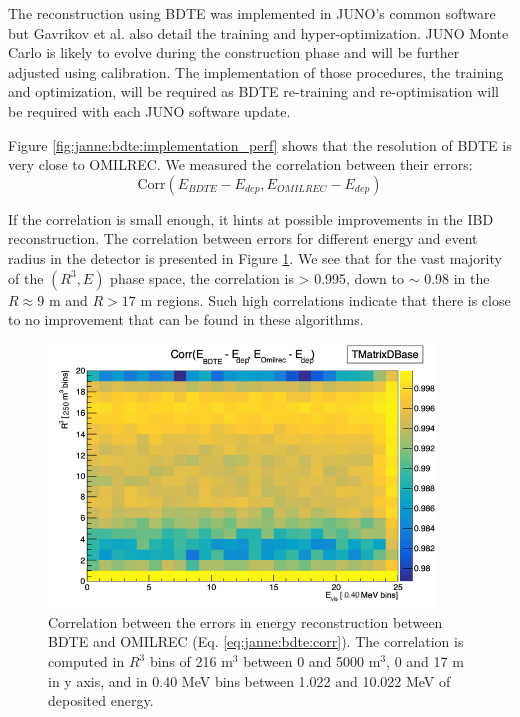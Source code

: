 \documentclass[../main.tex]{subfiles}
\begin{document}
The reconstruction using BDTE was implemented in JUNO's common software but Gavrikov et al. also detail the training and hyper-optimization. JUNO Monte Carlo is likely to evolve during the construction phase and will be further adjusted using calibration. The implementation of those procedures, the training and optimization, will be required as BDTE re-training and re-optimisation will be required with each JUNO software update.

Figure \ref{fig:janne:bdte:implementation_perf} shows that the resolution of BDTE is very close to OMILREC. We measured the correlation between their errors:
\begin{equation}
  \label{eq:janne:bdte:corr}
\mathrm{Corr}(E_{BDTE} - E_{dep}, E_{OMILREC} - E_{dep})
\end{equation}

If the correlation is small enough, it hints at possible improvements in the IBD reconstruction. The correlation between errors for different energy and event radius in the detector is presented in Figure \ref{fig:janne:bdte:corr}. We see that for the vast majority of the $(R^3, E)$ phase space, the correlation is > 0.995, down to $\sim$ 0.98 in the $R \approx 9$ m and $R > 17$ m regions. Such high correlations indicate that there is close to no improvement that can be found in these algorithms.

\begin{figure}
  \centering
  \includegraphics[height=7cm]{images/janne/bdte/corr_bdte_omilrec.png}
  \caption{Correlation between the errors in energy reconstruction between BDTE and OMILREC (Eq. \ref{eq:janne:bdte:corr}). The correlation is computed in $R^3$ bins of 216 m$^3$ between 0 and 5000 m$^3$, 0 and 17 m in y axis, and in 0.40 MeV bins between 1.022 and 10.022 MeV of deposited energy.}
  \label{fig:janne:bdte:corr}
\end{figure}
\end{document}
